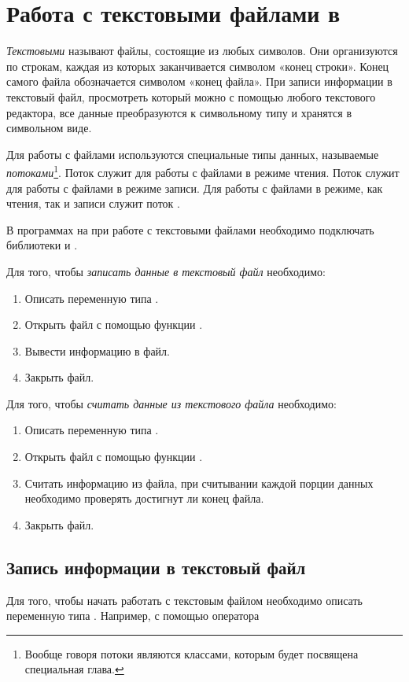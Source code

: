 \section[Работа с текстовыми файлами в \Sys{C++}]{Работа с текстовыми файлами в }\label{ch07:2}
\emph{Текстовыми} называют файлы, состоящие из любых символов. Они организуются по
строкам, каждая из которых заканчивается символом «конец строки». Конец самого файла обозначается символом «конец
файла». При записи информации в текстовый файл, просмотреть который можно с помощью любого текстового редактора, все
данные преобразуются к символьному типу и хранятся в символьном виде.

Для работы с файлами используются специальные типы данных, называемые
\emph{потоками}\footnote{Вообще говоря потоки являются классами, которым будет посвящена
специальная глава.}. Поток  служит для работы с файлами в режиме чтения. Поток
 служит для работы с файлами в режиме записи. Для работы с файлами в режиме, как чтения, так
и записи служит поток .

В программах на  при работе с текстовыми файлами необходимо подключать библиотеки  и
.

Для того, чтобы \emph{записать данные в текстовый файл} необходимо:
\begin{enumerate}
\item Описать переменную типа .
\item Открыть файл с помощью функции .
\item Вывести информацию в файл.
\item Закрыть файл.
\end{enumerate}

Для того, чтобы \emph{считать данные из текстового файла} необходимо:
\begin{enumerate}
\item Описать переменную типа .
\item Открыть файл с помощью функции .
\item Считать информацию из файла, при считывании каждой порции данных необходимо проверять достигнут ли конец файла.
\item Закрыть файл.
\end{enumerate}

\subsection[Запись информации в текстовый файл]{Запись информации в текстовый файл}
Для того, чтобы начать работать с текстовым файлом необходимо описать переменную типа .
Например, с помощью оператора

